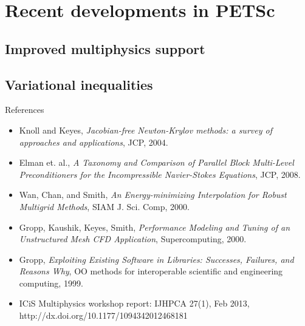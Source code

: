 \documentclass{beamer}
\begin{document}
\section{Recent developments in PETSc}
\subsection{Improved multiphysics support}







\subsection{Variational inequalities}


\begin{frame}{References}
  \begin{itemize}
  \item Knoll and Keyes, \emph{Jacobian-free Newton-Krylov methods: a survey of approaches and applications}, JCP, 2004.
  \item Elman et. al., \emph{A Taxonomy and Comparison of Parallel Block Multi-Level Preconditioners for the Incompressible Navier-Stokes Equations}, JCP, 2008.
  \item Wan, Chan, and Smith, \emph{An Energy-minimizing Interpolation for Robust Multigrid Methods}, SIAM J. Sci. Comp, 2000.
  \item Gropp, Kaushik, Keyes, Smith, \emph{Performance Modeling and Tuning of an Unstructured Mesh CFD Application}, Supercomputing, 2000.
  \item Gropp, \emph{Exploiting Existing Software in Libraries: Successes, Failures, and Reasons Why}, OO methods for interoperable scientific and engineering computing, 1999.
  \item ICiS Multiphysics workshop report:  IJHPCA 27(1), Feb 2013, http://dx.doi.org/10.1177/1094342012468181 
  \end{itemize}
\end{frame}
\end{document}
